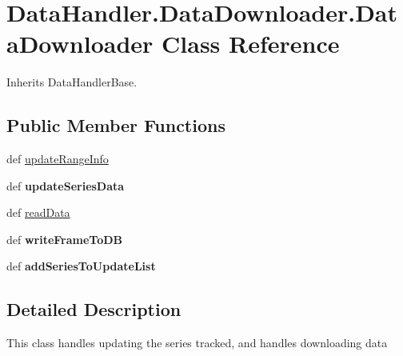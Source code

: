 \hypertarget{classDataHandler_1_1DataDownloader_1_1DataDownloader}{\section{\-Data\-Handler.\-Data\-Downloader.\-Data\-Downloader \-Class \-Reference}
\label{classDataHandler_1_1DataDownloader_1_1DataDownloader}
}


\-Inherits \-Data\-Handler\-Base.

\subsection*{\-Public \-Member \-Functions}
\begin{DoxyCompactItemize}
\item 
def \hyperlink{classDataHandler_1_1DataDownloader_1_1DataDownloader_a64cbd909b85c3d7daa50dd8d4194a3fd}{update\-Range\-Info}
\item 
\hypertarget{classDataHandler_1_1DataDownloader_1_1DataDownloader_a94245fe8ef3739bad8abb9b9ca23b7cd}{def {\bfseries update\-Series\-Data}}\label{classDataHandler_1_1DataDownloader_1_1DataDownloader_a94245fe8ef3739bad8abb9b9ca23b7cd}

\item 
def \hyperlink{classDataHandler_1_1DataDownloader_1_1DataDownloader_a7a1f87d338de93f7d1b76511665a33fb}{read\-Data}
\item 
\hypertarget{classDataHandler_1_1DataDownloader_1_1DataDownloader_abf0ed992ace6d6b5bb85172a0a1545f1}{def {\bfseries write\-Frame\-To\-D\-B}}\label{classDataHandler_1_1DataDownloader_1_1DataDownloader_abf0ed992ace6d6b5bb85172a0a1545f1}

\item 
\hypertarget{classDataHandler_1_1DataDownloader_1_1DataDownloader_adf48253e388c86e5ce023a83f443c019}{def {\bfseries add\-Series\-To\-Update\-List}}\label{classDataHandler_1_1DataDownloader_1_1DataDownloader_adf48253e388c86e5ce023a83f443c019}

\end{DoxyCompactItemize}


\subsection{\-Detailed \-Description}
\begin{DoxyVerb}This class handles updating the series tracked, and handles downloading data\end{DoxyVerb}
 

